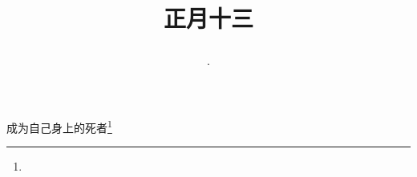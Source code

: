 \title{\date[d=22,m=2,y=2024][year:cn-y,年,month:cn,day:cn,日,·,weekday]·正月十三 }
成为自己身上的死者\footnote{ }

